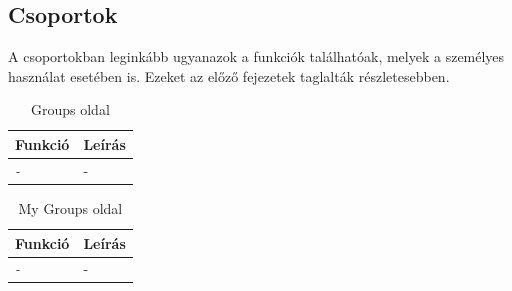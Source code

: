 \subsection{Csoportok}
A csoportokban leginkább ugyanazok a funkciók találhatóak, melyek a személyes használat esetében is. Ezeket az előző fejezetek taglalták részletesebben.
\begin{table}[H]
	\centering
	\begin{tabular}{ | m{} | m{} | }
		\hline
		\textbf{Funkció} & \textbf{Leírás} \\
		\hline \hline
		\emph{-} & - \\
		\hline
	\end{tabular}
	\caption{Groups oldal}
	\label{tab:groups}
\end{table}

\begin{table}[H]
	\centering
	\begin{tabular}{ | m{} | m{} | }
		\hline
		\textbf{Funkció} & \textbf{Leírás} \\
		\hline \hline
		\emph{-} & - \\
		\hline
	\end{tabular}
	\caption{My Groups oldal}
	\label{tab:my-groups}
\end{table}
